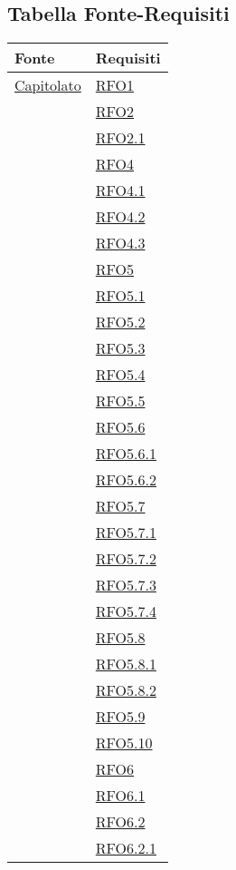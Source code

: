 \newpage
\subsection{Tabella Fonte-Requisiti}
\normalsize
\begin{longtable}{|>{\centering}m{5cm}|m{5cm}<{\centering}|}
\hline 
\textbf{Fonte} & \textbf{Requisiti}\\
\hline
\endhead
\hyperlink{Capitolato}{Capitolato} & \hyperlink{RFO1}{RFO1}\\
& \hyperlink{RFO2}{RFO2}\\
& \hyperlink{RFO2.1}{RFO2.1}\\
& \hyperlink{RFO4}{RFO4}\\
& \hyperlink{RFO4.1}{RFO4.1}\\
& \hyperlink{RFO4.2}{RFO4.2}\\
& \hyperlink{RFO4.3}{RFO4.3}\\
& \hyperlink{RFO5}{RFO5}\\
& \hyperlink{RFO5.1}{RFO5.1}\\
& \hyperlink{RFO5.2}{RFO5.2}\\
& \hyperlink{RFO5.3}{RFO5.3}\\
& \hyperlink{RFO5.4}{RFO5.4}\\
& \hyperlink{RFO5.5}{RFO5.5}\\
& \hyperlink{RFO5.6}{RFO5.6}\\
& \hyperlink{RFO5.6.1}{RFO5.6.1}\\
& \hyperlink{RFO5.6.2}{RFO5.6.2}\\
& \hyperlink{RFO5.7}{RFO5.7}\\
& \hyperlink{RFO5.7.1}{RFO5.7.1}\\
& \hyperlink{RFO5.7.2}{RFO5.7.2}\\
& \hyperlink{RFO5.7.3}{RFO5.7.3}\\
& \hyperlink{RFO5.7.4}{RFO5.7.4}\\
& \hyperlink{RFO5.8}{RFO5.8}\\
& \hyperlink{RFO5.8.1}{RFO5.8.1}\\
& \hyperlink{RFO5.8.2}{RFO5.8.2}\\
& \hyperlink{RFO5.9}{RFO5.9}\\
& \hyperlink{RFO5.10}{RFO5.10}\\
& \hyperlink{RFO6}{RFO6}\\
& \hyperlink{RFO6.1}{RFO6.1}\\
& \hyperlink{RFO6.2}{RFO6.2}\\
& \hyperlink{RFO6.2.1}{RFO6.2.1}\\

\end{longtable}
